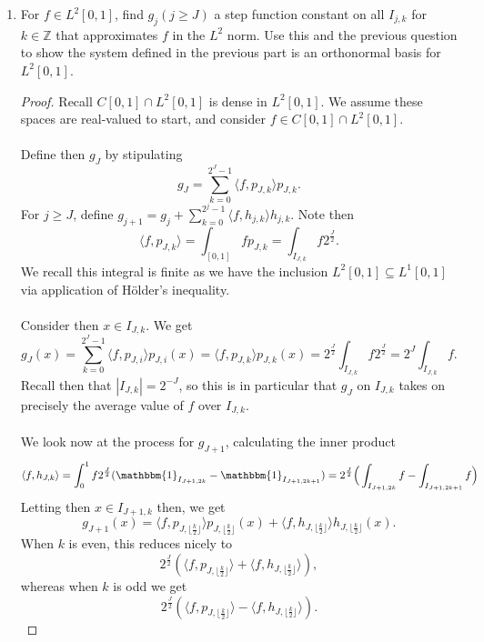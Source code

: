 \documentclass[12pt]{article}
\newenvironment{ex}[2][Exercise]{\begin{trivlist}
\item[\hskip \labelsep {\bfseries #1}\hskip \labelsep {\bfseries #2.}]}{\end{trivlist}}
\begin{document}
\begin{ex}{14}
\begin{enumerate}[label=(\alph*)]
\begin{proof}
        \end{proof}
        \item For $f \in L^2[0,1]$, find $g_j (j \geq J)$ a step function constant on all $I_{j,k}$ for $k \in \mathbb{Z}$ that approximates $f$ in the $L^2$ norm. Use this and the previous question to show the system defined in the previous part is an orthonormal basis for $L^2[0,1]$.
        \begin{proof}
            Recall $C[0,1] \cap L^2[0,1]$ is dense in $L^2[0,1]$. We assume these spaces are real-valued to start, and consider $f \in C[0,1] \cap L^2[0,1]$. \\ \\
            Define then $g_J$ by stipulating 
            $$g_J = \sum_{k = 0}^{2^J - 1} \langle f, p_{J,k} \rangle p_{J,k}.$$
            For $j \geq J$, define $g_{j + 1} = g_j + \sum_{k = 0}^{2^j - 1} \langle f, h_{j,k}\rangle h_{j,k}$. Note then 
            $$\langle f, p_{J,k} \rangle = \int_{[0,1]} fp_{J,k} = \int_{I_{J, k}} f2^{\frac{J}{2}}.$$
            We recall this integral is finite as we have the inclusion $L^2[0,1] \subseteq L^1[0,1]$ via application of H\"older's inequality. \\ \\
            Consider then $x \in I_{J,k}$. We get 
            $$g_J(x) = \sum_{k = 0}^{2^J - 1} \langle f, p_{J,i} \rangle p_{J,i}(x) = \langle f, p_{J,k} \rangle p_{J,k}(x) = 2^{\frac{J}{2}}\int_{I_{J, k}} f2^{\frac{J}{2}} = 2^J \int_{I_{J,k}} f.$$
            Recall then that $|I_{J,k}| = 2^{-J}$, so this is in particular that $g_J$ on $I_{J,k}$ takes on precisely the average value of $f$ over $I_{J,k}$. \\ \\
            We look now at the process for $g_{J + 1}$, calculating the inner product 
            $$\langle f, h_{J,k} \rangle = \int_0^1 f2^{\frac{J}{2}}(\mathbbm{1}_{I_{J + 1, 2k}} - \mathbbm{1}_{I_{J + 1, 2k + 1}}) = 2^{\frac{J}{2}} \Big ( \int_{I_{J + 1, 2k}} f - \int_{I_{J + 1, 2k + 1}} f \Big)$$
            Letting then $x \in I_{J + 1,k}$ then, we get 
            $$g_{J + 1}(x) = \langle f, p_{J, \lfloor \frac{k}{2} \rfloor}\rangle p_{J, \lfloor \frac{k}{2} \rfloor}(x) + \langle f, h_{J, \lfloor \frac{k}{2} \rfloor}\rangle h_{J, \lfloor \frac{k}{2} \rfloor}(x).$$
            When $k$ is even, this reduces nicely to 
            $$2^{\frac{J}{2}}(\langle f, p_{J,\lfloor \frac{k}{2} \rfloor} \rangle + \langle f, h_{J,\lfloor \frac{k}{2} \rfloor} \rangle),$$
            whereas when $k$ is odd we get
            $$2^{\frac{J}{2}}(\langle f, p_{J,\lfloor \frac{k}{2} \rfloor} \rangle - \langle f, h_{J,\lfloor \frac{k}{2} \rfloor} \rangle).$$

\end{proof}
\end{enumerate}
\end{ex}
\end{document}

